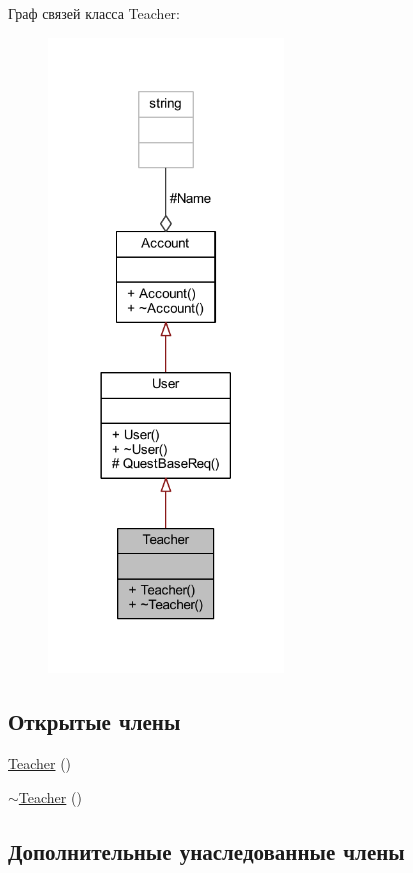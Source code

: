 Граф связей класса Teacher\+:\nopagebreak
\begin{figure}[H]
\begin{center}
\leavevmode
\includegraphics[width=177pt]{d0/dbe/class_teacher__coll__graph}
\end{center}
\end{figure}
\subsection*{Открытые члены}
\begin{DoxyCompactItemize}
\item 
\hyperlink{class_teacher_a0d09b151c46e2abb647a2ae40cc5510c}{Teacher} ()
\item 
\hyperlink{class_teacher_a27e515506e87deffe0cb21e26c4df90c}{$\sim$\+Teacher} ()
\end{DoxyCompactItemize}
\subsection*{Дополнительные унаследованные члены}



